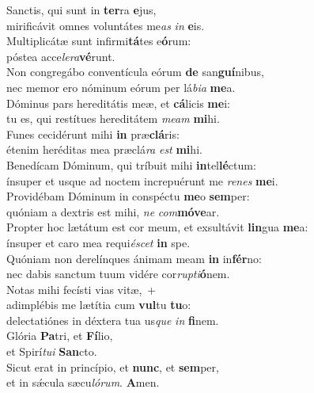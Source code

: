 \evenverse Sanctis, qui sunt in \textbf{ter}ra \textbf{e}jus,~\*\\
\evenverse mirificávit omnes voluntátes me\textit{as} \textit{in} \textbf{e}is.\\
\oddverse Multiplicátæ sunt infirmi\textbf{tá}tes e\textbf{ó}rum:~\*\\
\oddverse póstea acce\textit{le}\textit{ra}\textbf{vé}runt.\\
\evenverse Non congregábo conventícula eórum \textbf{de} san\textbf{guí}nibus,~\*\\
\evenverse nec memor ero nóminum eórum per lá\textit{bi}\textit{a} \textbf{me}a.\\
\oddverse Dóminus pars hereditátis meæ, et \textbf{cá}licis \textbf{me}i:~\*\\
\oddverse tu es, qui restítues hereditátem \textit{me}\textit{am} \textbf{mi}hi.\\
\evenverse Funes cecidérunt mihi \textbf{in} præ\textbf{clá}ris:~\*\\
\evenverse étenim heréditas mea præclá\textit{ra} \textit{est} \textbf{mi}hi.\\
\oddverse Benedícam Dóminum, qui tríbuit mihi \textbf{in}tel\textbf{lé}ctum:~\*\\
\oddverse ínsuper et usque ad noctem increpuérunt me \textit{re}\textit{nes} \textbf{me}i.\\
\evenverse Providébam Dóminum in conspéctu \textbf{me}o \textbf{sem}per:~\*\\
\evenverse quóniam a dextris est mihi, \textit{ne} \textit{com}\textbf{mó}\textbf{ve}ar.\\
\oddverse Propter hoc lætátum est cor meum, et exsultávit \textbf{lin}gua \textbf{me}a:~\*\\
\oddverse ínsuper et caro mea requi\textit{é}\textit{scet} \textbf{in} spe.\\
\evenverse Quóniam non derelínques ánimam meam \textbf{in} in\textbf{fér}no:~\*\\
\evenverse nec dabis sanctum tuum vidére cor\textit{rup}\textit{ti}\textbf{ó}nem.\\
\oddverse Notas mihi fecísti vias vitæ,~+\\
\oddverse  adimplébis me lætítia cum \textbf{vul}tu \textbf{tu}o:~\*\\
\oddverse delectatiónes in déxtera tua us\textit{que} \textit{in} \textbf{fi}nem.\\
\evenverse Glória \textbf{Pa}tri, et \textbf{Fí}lio,~\*\\
\evenverse et Spirí\textit{tu}\textit{i} \textbf{San}cto.\\
\oddverse Sicut erat in princípio, et \textbf{nunc}, et \textbf{sem}per,~\*\\
\oddverse et in sǽcula sæcu\textit{ló}\textit{rum}. \textbf{A}men.\\
